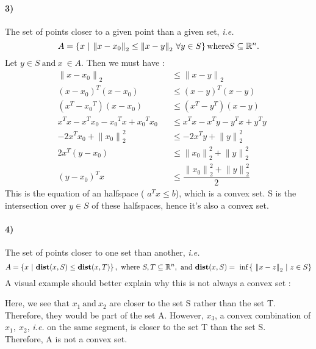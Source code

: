 \documentclass[12pt,a4paper]{article}
\begin{document}
\paragraph{3)} The set of points closer to a given point than a given set, \textit{i.e.} $$
	A = \left\lbrace x ~| ~{\| x - x_0 \|}_2 \leq {\|x-y\|}_2 ~\forall y \in S \right\rbrace \\ \text{where} S \subseteq \mathbb{R}^n.

$$
Let  $ y \in S ~\text{and} ~x~\in A$. Then we must have :
\begin{align*}
&	{\| x- x_0 \|}_2 &&\leq {\| x-y\|}_2\\
			 &	(x-x_0)^T (x-x_0) &&\leq (x-y)^T(x-y) 			 \\
			 & (x^T - {x_0}^T )(x-x_0) &&\leq (x^T -y^T)(x-y)\\
			 & x^T x - x^T x_0 - {x_0}^Tx + {x_0}^T x_0 && \leq  x^Tx - x^Ty - y^Tx + y^Ty\\
			 & -2x^Tx_0 + {\|x_0\|}_2^2 &&\leq -2x^Ty + {\|y\|}_2^2\\
			 & 2x^T(y-x_0) &&\leq {\|x_0\|}_2^2 + {\|y\|}_2^2 \\
			 & (y-{x_0})^Tx &&\leq \dfrac{{\|x_0\|}_2^2 + {\|y\|}_2^2}{2}
\end{align*}
This is the equation of an halfspace ( $ a^T x \leq b $), which is a convex set. 
S is the intersection over $ y \in S $ of these halfspaces, hence it's also a convex set.
\paragraph{4)} The set of points closer to one set than another, \textit{i.e.} $$ A = \left\lbrace x ~| ~\text{\textbf{dist}}(x,S) \leq \text{\textbf{dist}}(x,T)\right\rbrace , \\ 
~\text{where} ~S,T \subseteq \mathbb{R}^n, ~\text{and} ~\text{\textbf{dist}}(x,S)=~\text{inf}\left\lbrace~{\|x-z\|}_2 ~| ~z \in S\right\rbrace$$
A visual example should better explain why this is not always a convex set :
\begin{center}
\end{center}
Here, we see that $ x_1 ~\text{and}~ x_2 $ are closer to the set S rather than the set T. Therefore, they would be part of the set A. 
However, $ x_3 $, a convex combination of $ x_1,~x_2 $, \textit{i.e.} on the same segment, is closer to the set T than the set S.\\
Therefore, A is not a convex set.
\end{document}

